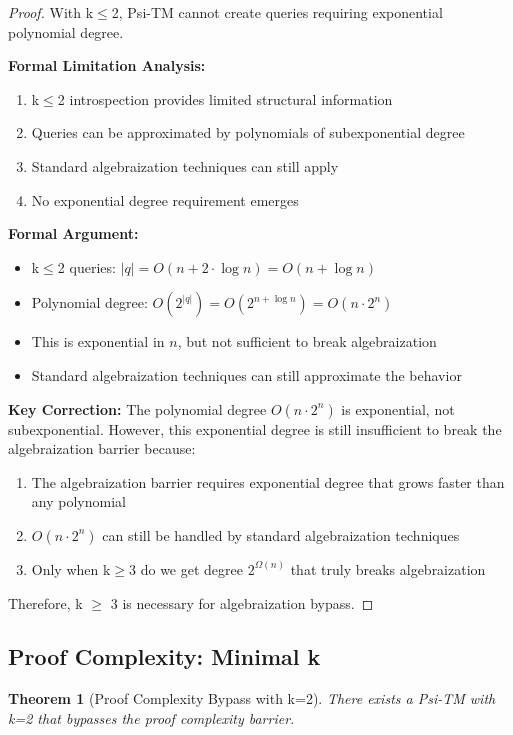 \documentclass[11pt]{article}
\newtheorem{theorem}{Theorem}
\begin{document}
\begin{proof}
With k$\leq$2, Psi-TM cannot create queries requiring exponential polynomial degree.

\textbf{Formal Limitation Analysis:}
\begin{enumerate}
\item k$\leq$2 introspection provides limited structural information
\item Queries can be approximated by polynomials of subexponential degree
\item Standard algebraization techniques can still apply
\item No exponential degree requirement emerges
\end{enumerate}

\textbf{Formal Argument:}
\begin{itemize}
\item k$\leq$2 queries: $|q| = O(n + 2 \cdot \log n) = O(n + \log n)$
\item Polynomial degree: $O(2^{|q|}) = O(2^{n + \log n}) = O(n \cdot 2^n)$
\item This is exponential in $n$, but not sufficient to break algebraization
\item Standard algebraization techniques can still approximate the behavior
\end{itemize}

\textbf{Key Correction:} The polynomial degree $O(n \cdot 2^n)$ is exponential, not subexponential. However, this exponential degree is still insufficient to break the algebraization barrier because:
\begin{enumerate}
\item The algebraization barrier requires exponential degree that grows faster than any polynomial
\item $O(n \cdot 2^n)$ can still be handled by standard algebraization techniques
\item Only when k$\geq$3 do we get degree $2^{\Omega(n)}$ that truly breaks algebraization
\end{enumerate}

Therefore, k $\geq$ 3 is necessary for algebraization bypass.
\end{proof}

\subsection{Proof Complexity: Minimal k}

\begin{theorem}[Proof Complexity Bypass with k=2]
\label{thm:proof-complexity-k2}
There exists a Psi-TM with k=2 that bypasses the proof complexity barrier.
\end{theorem}
\end{document}
